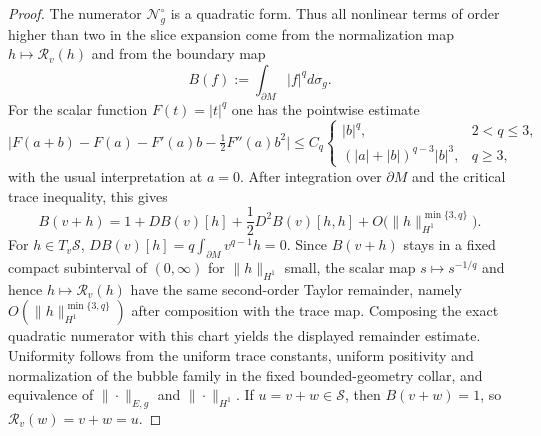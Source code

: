 \documentclass[11pt,reqno,a4paper]{amsart}
\numberwithin{equation}{section}
\theoremstyle{plain}
\theoremstyle{remark}
\theoremstyle{plain}
\begin{document}
\begin{proof}
The numerator $\mathcal N_g^\circ$ is a quadratic form.  Thus all nonlinear
terms of order higher than two in the slice expansion come from the
normalization map $h\mapsto\mathcal R_v(h)$ and from the boundary map
\[
B(f):=\int_{\partial M}|f|^q d\sigma_g .
\]
For the scalar function $F(t)=|t|^q$ one has the pointwise estimate
\[
\big|F(a+b)-F(a)-F'(a)b-\tfrac12F''(a)b^2\big|
\le C_q
\begin{cases}
|b|^q, & 2<q\le3,\\
(|a|+|b|)^{q-3}|b|^3, & q\ge3,
\end{cases}
\]
with the usual interpretation at $a=0$.  After integration over $\partial M$
and the critical trace inequality, this gives
\[
B(v+h)=1+DB(v)[h]+\frac12D^2B(v)[h,h]
+O\bigl(\|h\|_{H^1}^{\min\{3,q\}}\bigr).
\]
For $h\in T_v\mathcal S$, $DB(v)[h]=q\int_{\partial M}v^{q-1}h=0$.
Since $B(v+h)$ stays in a fixed compact subinterval of $(0,\infty)$ for
$\|h\|_{H^1}$ small, the scalar map $s\mapsto s^{-1/q}$ and hence
$h\mapsto\mathcal R_v(h)$ have the same second-order Taylor remainder,
namely $O(\|h\|_{H^1}^{\min\{3,q\}})$ after composition with the trace map.
Composing the exact quadratic numerator with this chart yields the displayed
remainder estimate.  Uniformity follows from the uniform trace constants,
uniform positivity and normalization of the bubble family in the fixed
bounded-geometry collar, and equivalence of $\|\cdot\|_{E,g}$ and
$\|\cdot\|_{H^1}$.
If $u=v+w\in\mathcal S$, then $B(v+w)=1$, so $\mathcal R_v(w)=v+w=u$.
\end{proof}
\end{document}
